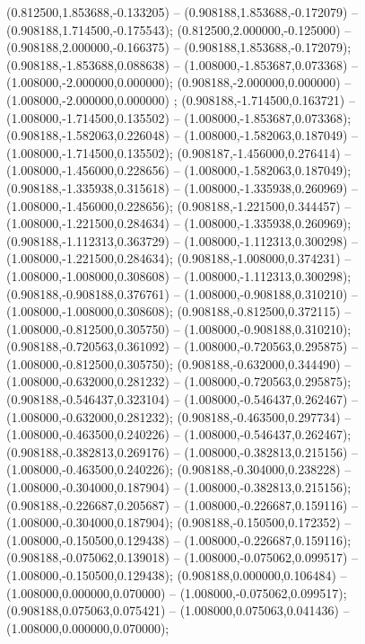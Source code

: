  (0.812500,1.853688,-0.133205) -- (0.908188,1.853688,-0.172079) -- (0.908188,1.714500,-0.175543);
 (0.812500,2.000000,-0.125000) -- (0.908188,2.000000,-0.166375) -- (0.908188,1.853688,-0.172079);
 (0.908188,-1.853688,0.088638) -- (1.008000,-1.853687,0.073368) -- (1.008000,-2.000000,0.000000);
 (0.908188,-2.000000,0.000000) -- (1.008000,-2.000000,0.000000) ;
 (0.908188,-1.714500,0.163721) -- (1.008000,-1.714500,0.135502) -- (1.008000,-1.853687,0.073368);
 (0.908188,-1.582063,0.226048) -- (1.008000,-1.582063,0.187049) -- (1.008000,-1.714500,0.135502);
 (0.908187,-1.456000,0.276414) -- (1.008000,-1.456000,0.228656) -- (1.008000,-1.582063,0.187049);
 (0.908188,-1.335938,0.315618) -- (1.008000,-1.335938,0.260969) -- (1.008000,-1.456000,0.228656);
 (0.908188,-1.221500,0.344457) -- (1.008000,-1.221500,0.284634) -- (1.008000,-1.335938,0.260969);
 (0.908188,-1.112313,0.363729) -- (1.008000,-1.112313,0.300298) -- (1.008000,-1.221500,0.284634);
 (0.908188,-1.008000,0.374231) -- (1.008000,-1.008000,0.308608) -- (1.008000,-1.112313,0.300298);
 (0.908188,-0.908188,0.376761) -- (1.008000,-0.908188,0.310210) -- (1.008000,-1.008000,0.308608);
 (0.908188,-0.812500,0.372115) -- (1.008000,-0.812500,0.305750) -- (1.008000,-0.908188,0.310210);
 (0.908188,-0.720563,0.361092) -- (1.008000,-0.720563,0.295875) -- (1.008000,-0.812500,0.305750);
 (0.908188,-0.632000,0.344490) -- (1.008000,-0.632000,0.281232) -- (1.008000,-0.720563,0.295875);
 (0.908188,-0.546437,0.323104) -- (1.008000,-0.546437,0.262467) -- (1.008000,-0.632000,0.281232);
 (0.908188,-0.463500,0.297734) -- (1.008000,-0.463500,0.240226) -- (1.008000,-0.546437,0.262467);
 (0.908188,-0.382813,0.269176) -- (1.008000,-0.382813,0.215156) -- (1.008000,-0.463500,0.240226);
 (0.908188,-0.304000,0.238228) -- (1.008000,-0.304000,0.187904) -- (1.008000,-0.382813,0.215156);
 (0.908188,-0.226687,0.205687) -- (1.008000,-0.226687,0.159116) -- (1.008000,-0.304000,0.187904);
 (0.908188,-0.150500,0.172352) -- (1.008000,-0.150500,0.129438) -- (1.008000,-0.226687,0.159116);
 (0.908188,-0.075062,0.139018) -- (1.008000,-0.075062,0.099517) -- (1.008000,-0.150500,0.129438);
 (0.908188,0.000000,0.106484) -- (1.008000,0.000000,0.070000) -- (1.008000,-0.075062,0.099517);
 (0.908188,0.075063,0.075421) -- (1.008000,0.075063,0.041436) -- (1.008000,0.000000,0.070000);

